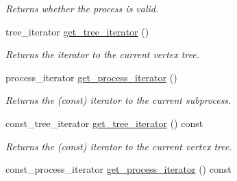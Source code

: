 \begin{DoxyCompactItemize}
\begin{DoxyCompactList}\small\item\em Returns whether the process is valid. \end{DoxyCompactList}\item 
\hypertarget{a00070_a91757a172f26e1c2f31510ac75e44fe1}{tree\-\_\-iterator \hyperlink{a00070_a91757a172f26e1c2f31510ac75e44fe1}{get\-\_\-tree\-\_\-iterator} ()}\label{a00070_a91757a172f26e1c2f31510ac75e44fe1}

\begin{DoxyCompactList}\small\item\em Returns the iterator to the current vertex tree. \end{DoxyCompactList}\item 
\hypertarget{a00070_a4d862eea43cea5aaf0bda13fb48bbd6b}{process\-\_\-iterator \hyperlink{a00070_a4d862eea43cea5aaf0bda13fb48bbd6b}{get\-\_\-process\-\_\-iterator} ()}\label{a00070_a4d862eea43cea5aaf0bda13fb48bbd6b}

\begin{DoxyCompactList}\small\item\em Returns the (const) iterator to the current subprocess. \end{DoxyCompactList}\item 
\hypertarget{a00070_a335247a222e3b6f0d9be9cdfceb2d7c4}{const\-\_\-tree\-\_\-iterator \hyperlink{a00070_a335247a222e3b6f0d9be9cdfceb2d7c4}{get\-\_\-tree\-\_\-iterator} () const }\label{a00070_a335247a222e3b6f0d9be9cdfceb2d7c4}

\begin{DoxyCompactList}\small\item\em Returns the (const) iterator to the current vertex tree. \end{DoxyCompactList}\item 
\hypertarget{a00070_a9d5cd54f6e37e3b23a45e6576f34791d}{const\-\_\-process\-\_\-iterator \hyperlink{a00070_a9d5cd54f6e37e3b23a45e6576f34791d}{get\-\_\-process\-\_\-iterator} () const }\label{a00070_a9d5cd54f6e37e3b23a45e6576f34791d}


\end{DoxyCompactItemize}
